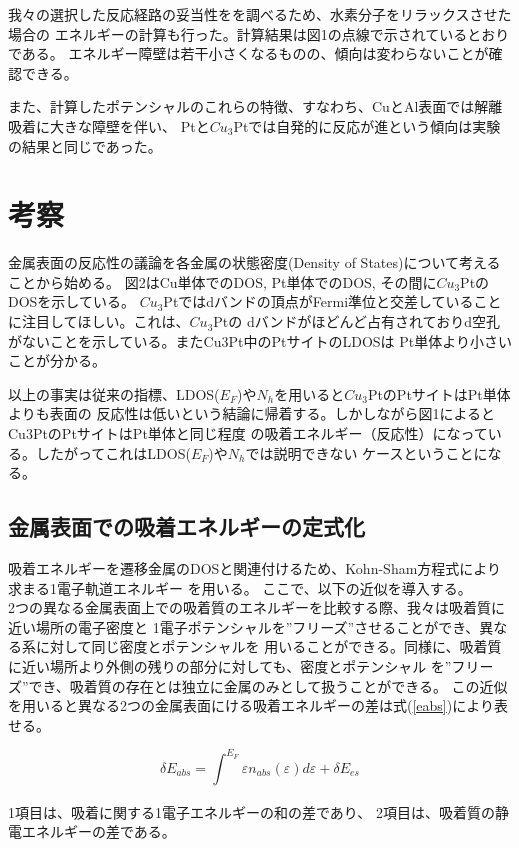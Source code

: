 \documentclass[12pt]{ltjsarticle}
\begin{document}
我々の選択した反応経路の妥当性をを調べるため、水素分子をリラックスさせた場合の
エネルギーの計算も行った。計算結果は図1の点線で示されているとおりである。
エネルギー障壁は若干小さくなるものの、傾向は変わらないことが確認できる。

また、計算したポテンシャルのこれらの特徴、すなわち、CuとAl表面では解離吸着に大きな障壁を伴い、
Ptと$Cu_3$Ptでは自発的に反応が進という傾向は実験の結果と同じであった。

\section{考察}

金属表面の反応性の議論を各金属の状態密度(Density of States)について考えることから始める。
図2はCu単体でのDOS, Pt単体でのDOS, その間に$Cu_3$PtのDOSを示している。
$Cu_3$Ptではdバンドの頂点がFermi準位と交差していることに注目してほしい。これは、$Cu_3$Ptの
dバンドがほどんど占有されておりd空孔がないことを示している。またCu3Pt中のPtサイトのLDOSは
Pt単体より小さいことが分かる。

以上の事実は従来の指標、LDOS($E_F$)や$N_h$を用いると$Cu_3$PtのPtサイトはPt単体よりも表面の
反応性は低いという結論に帰着する。しかしながら図1によるとCu3PtのPtサイトはPt単体と同じ程度
の吸着エネルギー（反応性）になっている。したがってこれはLDOS($E_F$)や$N_h$では説明できない
ケースということになる。

\subsection{金属表面での吸着エネルギーの定式化}
吸着エネルギーを遷移金属のDOSと関連付けるため、Kohn-Sham方程式により求まる1電子軌道エネルギー
を用いる。
ここで、以下の近似を導入する。\\
2つの異なる金属表面上での吸着質のエネルギーを比較する際、我々は吸着質に近い場所の電子密度と
1電子ポテンシャルを”フリーズ”させることができ、異なる系に対して同じ密度とポテンシャルを
用いることができる。同様に、吸着質に近い場所より外側の残りの部分に対しても、密度とポテンシャル
を”フリーズ”でき、吸着質の存在とは独立に金属のみとして扱うことができる。
この近似を用いると異なる2つの金属表面にける吸着エネルギーの差は式(\ref{eabs})により表せる。

\begin{equation}
    \label{eabs}
    \delta E_{abs} = \int_{}^{E_F} \varepsilon n_{abs}(\varepsilon) d\varepsilon + 
    \delta E_{es}
\end{equation}

1項目は、吸着に関する1電子エネルギーの和の差であり、
2項目は、吸着質の静電エネルギーの差である。
\end{document}
